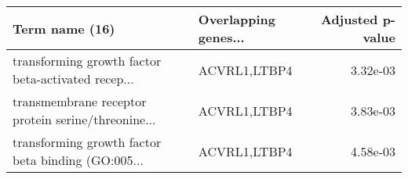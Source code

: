 \begin{tabular}{llr}
\toprule
                                    Term name (16) & Overlapping genes... &  Adjusted p-value \\
\midrule
transforming growth factor beta-activated recep... &         ACVRL1,LTBP4 &          3.32e-03 \\
transmembrane receptor protein serine/threonine... &         ACVRL1,LTBP4 &          3.83e-03 \\
transforming growth factor beta binding (GO:005... &         ACVRL1,LTBP4 &          4.58e-03 \\
\bottomrule
\end{tabular}
